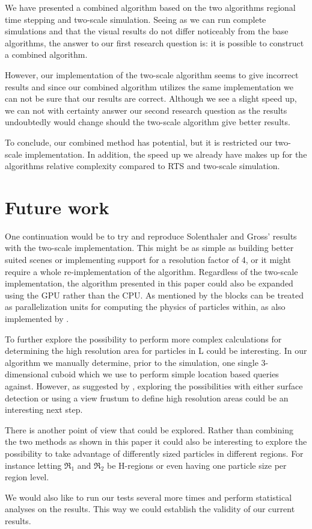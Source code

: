 \documentclass[../../main.tex]{subfiles}
\begin{document}
\tracingall

We have presented a combined algorithm based on the two algorithms regional time stepping and two-scale simulation. Seeing as we can run complete simulations and that the visual results do not differ noticeably from the base algorithms, the answer to our first research question is: it is possible to construct a combined algorithm. 

However, our implementation of the two-scale algorithm seems to give incorrect results and since our combined algorithm utilizes the same implementation we can not be sure that our results are correct. Although we see a slight speed up, we can not with certainty answer our second research question as the results undoubtedly would change should the two-scale algorithm give better results. 

To conclude, our combined method has potential, but it is restricted our two-scale implementation. In addition, the speed up we already have makes up for the algorithms relative complexity compared to RTS and two-scale simulation. 


\section{Future work}

One continuation would be to try and reproduce Solenthaler and Gross' results with the two-scale implementation. This might be as simple as building better suited scenes or implementing support for a resolution factor of 4, or it might require a whole re-implementation of the algorithm. Regardless of the two-scale implementation, the algorithm presented in this paper could also be expanded using the GPU rather than the CPU. As mentioned by \citet{goswami2014regional} the blocks can be treated as parallelization units for computing the physics of particles within, as also implemented by \citet{goswami2010interactive}.

To further explore the possibility to perform more complex calculations for determining the high resolution area for particles in L could be interesting. In our algorithm we manually determine, prior to the simulation, one single 3-dimensional cuboid which we use to perform simple location based queries against. However, as suggested by \citet{solenthaler2011two}, exploring the possibilities with either surface detection or using a view frustum to define high resolution areas could be an interesting next step. 

There is another point of view that could be explored. Rather than combining the two methods as shown in this paper it could also be interesting to explore the possibility to take advantage of differently sized particles in different regions. For instance letting $\Re_1$ and $\Re_2$ be H-regions or even having one particle size per region level. 

We would also like to run our tests several more times and perform statistical analyses on the results. This way we could establish the validity of our current results. 
\end{document}
